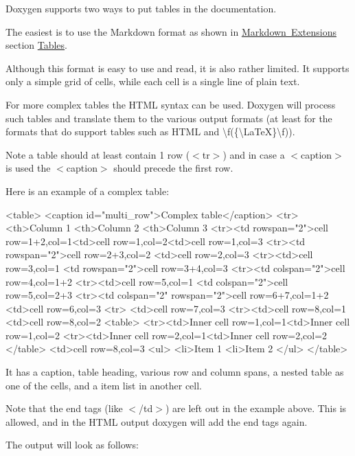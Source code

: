 Doxygen supports two ways to put tables in the documentation.

The easiest is to use the Markdown format as shown in \mbox{\hyperlink{markdown_markdown_extra}{Markdown Extensions}} section \mbox{\hyperlink{markdown_md_tables}{Tables}}.

Although this format is easy to use and read, it is also rather limited. It supports only a simple grid of cells, while each cell is a single line of plain text.

For more complex tables the H\+T\+ML syntax can be used. Doxygen will process such tables and translate them to the various output formats (at least for the formats that do support tables such as H\+T\+ML and \textbackslash{}f(\{\textbackslash{}\+La\+TeX\}\textbackslash{}f)).

Note a table should at least contain 1 row ({\ttfamily $<$tr$>$}) and in case a {\ttfamily $<$caption$>$} is used the {\ttfamily $<$caption$>$} should precede the first row.

Here is an example of a complex table\+:

\begin{DoxyVerb}<table>
<caption id="multi_row">Complex table</caption>
<tr><th>Column 1                      <th>Column 2        <th>Column 3
<tr><td rowspan="2">cell row=1+2,col=1<td>cell row=1,col=2<td>cell row=1,col=3
<tr><td rowspan="2">cell row=2+3,col=2                    <td>cell row=2,col=3
<tr><td>cell row=3,col=1                                  <td rowspan="2">cell row=3+4,col=3
<tr><td colspan="2">cell row=4,col=1+2
<tr><td>cell row=5,col=1              <td colspan="2">cell row=5,col=2+3
<tr><td colspan="2" rowspan="2">cell row=6+7,col=1+2      <td>cell row=6,col=3
<tr>                                                      <td>cell row=7,col=3
<tr><td>cell row=8,col=1              <td>cell row=8,col=2\n
  <table>
    <tr><td>Inner cell row=1,col=1<td>Inner cell row=1,col=2
    <tr><td>Inner cell row=2,col=1<td>Inner cell row=2,col=2
  </table>
  <td>cell row=8,col=3
  <ul>
    <li>Item 1
    <li>Item 2
  </ul>
</table>
\end{DoxyVerb}


It has a caption, table heading, various row and column spans, a nested table as one of the cells, and a item list in another cell.

Note that the end tags (like {\ttfamily $<$/td$>$}) are left out in the example above. This is allowed, and in the H\+T\+ML output doxygen will add the end tags again.

 \newpage  The output will look as follows\+:

